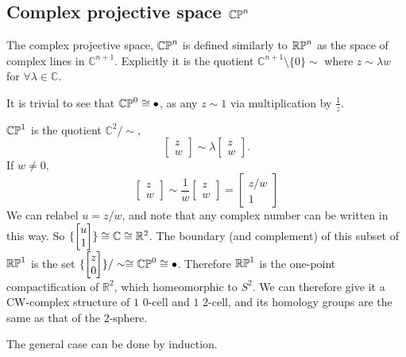 \subsection{Complex projective space $\mathbb{CP}^{n}$}\label{sec-complex-projective-space}
The complex projective space, $\mathbb{CP}^{n}$ is defined similarly to $\mathbb{RP}^{n}$ as the space of complex lines in $\mathbb{C}^{n+1}$. Explicitly it is the quotient $\mathbb{C}^{n+1}\setminus \{0\}  \sim$ where $z\sim \lambda w$ for $\forall\lambda \in \mathbb{C}$. 

It is trivial to see that $\mathbb{CP}^{0}\cong\bullet$, as any $z\sim 1$ via multiplication by $\frac{1}{z}$. 

$\mathbb{CP}^{1}$ is the quotient $\mathbb{C}^2/\sim,$
$$\begin{bmatrix} z\\ w \end{bmatrix}\sim \lambda \begin{bmatrix} z\\ w \end{bmatrix}.$$
If $w\neq 0,$ $$\begin{bmatrix} z\\ w\end{bmatrix}\sim \frac{1}{w}\begin{bmatrix} z\\ w\end{bmatrix}=\begin{bmatrix} z/w\\ 1\end{bmatrix}$$ We can relabel $u=z/w$, and note that any complex number can be written in this way. So $\{\begin{bmatrix} u\\ 1\end{bmatrix}\}\cong \mathbb{C}\cong \mathbb{R}^2$. The boundary (and complement) of this subset of $\mathbb{RP}^{1}$ is the set $\{\begin{bmatrix} z\\ 0\end{bmatrix}\}/\sim\cong \mathbb{CP}^{0}\cong\bullet$. Therefore $\mathbb{RP}^{1}$ is the one-point compactification of $\mathbb{R}^2$, which homeomorphic to $S^2$. We can therefore give it a CW-complex structure of $1$ $0$-cell and $1$ $2$-cell, and its homology groups are the same as that of the $2$-sphere.

The general case can be done by induction.

